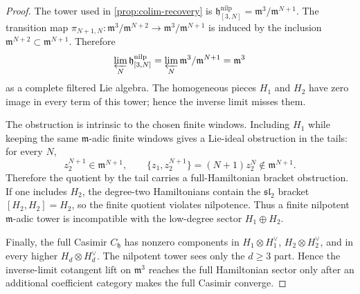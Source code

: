 \begin{proof}
  The tower used in \ref{prop:colim-recovery} is
  \(\mathfrak h^{\mathrm{nilp}}_{[3,N]}=\mathfrak m^3/\mathfrak m^{N+1}\).
  The transition map
  \(\pi_{N+1,N}\colon\mathfrak m^3/\mathfrak m^{N+2}\to
  \mathfrak m^3/\mathfrak m^{N+1}\) is induced by the inclusion
  \(\mathfrak m^{N+2}\subset\mathfrak m^{N+1}\).  Therefore
  \[
    \varprojlim_N \mathfrak h^{\mathrm{nilp}}_{[3,N]}
      =\varprojlim_N \mathfrak m^3/\mathfrak m^{N+1}
      =\mathfrak m^3
  \]
  as a complete filtered Lie algebra.  The homogeneous pieces
  \(H_1\) and \(H_2\) have zero image in every term of this tower;
  hence the inverse limit misses them.

  The obstruction is intrinsic to the chosen finite windows.  Including
  \(H_1\) while keeping the same \(\mathfrak m\)-adic finite windows gives
  a Lie-ideal obstruction in the tails: for every \(N\),
  \[
    z_2^{N+1}\in\mathfrak m^{N+1},\qquad
    \{z_1,z_2^{N+1}\}=(N+1)z_2^N\notin\mathfrak m^{N+1}.
  \]
  Therefore the quotient by the tail carries a full-Hamiltonian bracket
  obstruction.  If one includes \(H_2\), the degree-two
  Hamiltonians contain the \(\mathfrak{sl}_2\) bracket
  \([H_2,H_2]=H_2\), so the finite quotient violates nilpotence.  Thus a
  finite nilpotent \(\mathfrak m\)-adic tower is incompatible with the
  low-degree sector \(H_1\oplus H_2\).

  Finally, the full Casimir \(C_{\mathfrak h}\) has nonzero components
  in \(H_1\otimes H_1^\vee\), \(H_2\otimes H_2^\vee\), and in every
  higher \(H_d\otimes H_d^\vee\).  The nilpotent tower sees only the
	  \(d\geq3\) part.  Hence the inverse-limit cotangent lift on
	  \(\mathfrak m^3\) reaches the full Hamiltonian sector only after
	  an additional coefficient category makes the full Casimir converge.
\end{proof}


